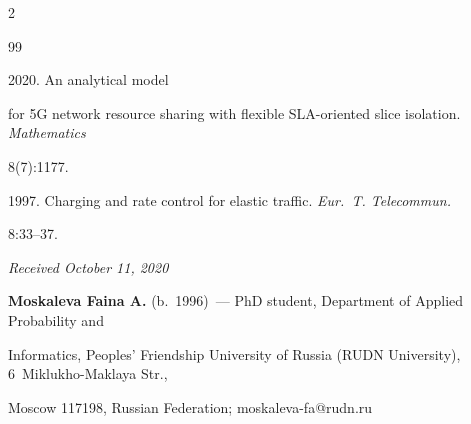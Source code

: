 \begin{multicols}{2}
{{\begin{thebibliography}{99}


 2020. An analytical model 


for 5G network resource sharing with flexible SLA-oriented slice isolation. \textit{Mathematics} 


8(7):1177.




 1997. Charging and rate control for elastic traffic. \textit{Eur.~T. Telecommun.} 


8:33--37.


\end{thebibliography}





 }


 }





\end{multicols}





\vspace*{-3pt}





\hfill{\small\textit{Received October 11, 2020}}


















\Contr





\noindent


\textbf{Moskaleva Faina A.} (b.\ 1996)~--- PhD student, Department of Applied Probability and 


Informatics, Peoples' Friendship University of Russia (RUDN University), 6~Miklukho-Maklaya Str., 


Moscow 117198, Russian Federation; \mbox{moskaleva-fa@rudn.ru}





\vspace*{3pt}





